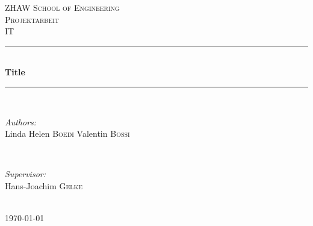 \documentclass[12pt, a4paper]{report}
\begin{document}
    
    \begin{titlepage}
    
    \newcommand{\HRule}{\rule{\linewidth}{0.5mm}} %
    
    \center %
    
    \textsc{\LARGE ZHAW School of Engineering}\\[1.5cm] %
    \textsc{\Large Projektarbeit}\\[0.5cm] %
    \textsc{\large IT}\\[0.5cm] %
    
    \HRule \\[0.4cm]
    { \huge \bfseries Title}\\[0.4cm] %
    \HRule \\[1.5cm]
    
    
    \begin{minipage}{0.4\textwidth}
    \begin{flushleft} \large
    \emph{Authors:}\\
    Linda Helen \textsc{Boedi}  Valentin \textsc{Bossi} %
    \end{flushleft}
    \end{minipage}
    ~
    \begin{minipage}{0.4\textwidth}
    \begin{flushright} \large
    \emph{Supervisor:} \\
    Hans-Joachim  \textsc{Gelke} %
    \end{flushright}
    \end{minipage}\\[2cm]
    
    
    {\large \today}\\[2cm] 
    

\end{titlepage}
\end{document}

